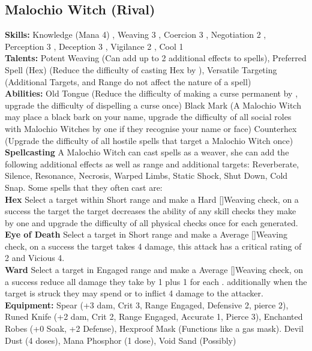 \documentclass{article}
\newcommand\Average{Average [\Purple[2]]}
\newcommand\Hard{Hard [\Purple[3]]}
\begin{document}
\begin{multicols}{2}
{\subsection{Malochio Witch (Rival)}
\begin{center}
\end{center}
\textbf{Skills:}
Knowledge (Mana 4) \Yellow[4],
Weaving 3 \Yellow[3]\Green[1],
Coercion 3 \Yellow[3]\Green[1], 
Negotiation 2  \Yellow[2]\Green[2],
Perception 3 \Yellow[3],
Deception 3  \Yellow[3],
Vigilance 2 \Yellow[2]\Green[1],
Cool 1 \Yellow[1]\Green[2]
\\\textbf{Talents:}
Potent Weaving (Can add up to 2 additional effects to spells),
Preferred Spell (Hex) (Reduce the difficulty of casting Hex by \Purple[1]),
Versatile Targeting (Additional Targets, and Range do not affect the nature of a spell)
\\\textbf{Abilities:}
Old Tongue (Reduce the difficulty of making a curse permanent by \Purple[1], upgrade the difficulty of dispelling a curse once)
Black Mark (A Malochio Witch may place a black bark on your name, upgrade the difficulty of all social roles with Malochio Witches by one if they recognise your name or face)
Counterhex (Upgrade the difficulty of all hostile spells that target a Malochio Witch once)
\\\textbf{Spellcasting} A Malochio Witch can cast spells as a weaver, she can add the following additional effects as well as range and additional targets: Reverberate, Silence, Resonance, Necrosis, Warped Limbs, Static Shock, Shut Down, Cold Snap. Some spells that they often cast are:
\\\textbf{Hex} Select a target within Short range and make a \Hard Weaving check, on a success the target the target decreases the ability of any skill checks they make by one and upgrade the difficulty of all physical checks once for each \Success\Success generated.
\\\textbf{Eye of Death} Select a target in Short range and make a \Average Weaving check, on a success the target takes 4 damage, this attack has a critical rating of 2 and Vicious 4.
\\\textbf{Ward} Select a target in Engaged range and make a \Average Weaving check, on a success reduce all damage they take by 1 plus 1 for each \Success\Success. additionally when the target is struck they may spend \Threat\Threat or \Despair to inflict 4 damage to the attacker.
\\\textbf{Equipment:} Spear (+3 dam, Crit 3, Range Engaged, Defensive 2, pierce 2), Runed Knife (+2 dam, Crit 2, Range Engaged, Accurate 1, Pierce 3), Enchanted Robes (+0 Soak, +2 Defense), Hexproof Mask (Functions like a gas mask). Devil Dust (4 doses), Mana Phosphor (1 dose), Void Sand (Possibly)
}


\end{multicols}
\end{document}
